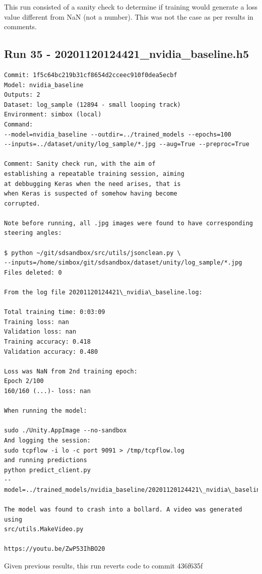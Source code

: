 This run consisted of a sanity check to determine if training would generate a loss value different from NaN (not a number). This was not the case as per results in comments.

\subsection{Run 35 - 20201120124421\_nvidia\_baseline.h5}
\begin{verbatim}
Commit: 1f5c64bc219b31cf8654d2cceec910f0dea5ecbf
Model: nvidia_baseline
Outputs: 2
Dataset: log_sample (12894 - small looping track)
Environment: simbox (local)
Command: 
--model=nvidia_baseline --outdir=../trained_models --epochs=100
--inputs=../dataset/unity/log_sample/*.jpg --aug=True --preproc=True

Comment: Sanity check run, with the aim of
establishing a repeatable training session, aiming
at debbugging Keras when the need arises, that is
when Keras is suspected of somehow having become 
corrupted. 

Note before running, all .jpg images were found to have corresponding 
steering angles:

$ python ~/git/sdsandbox/src/utils/jsonclean.py \
--inputs=/home/simbox/git/sdsandbox/dataset/unity/log_sample/*.jpg
Files deleted: 0

From the log file 20201120124421\_nvidia\_baseline.log:

Total training time: 0:03:09
Training loss: nan
Validation loss: nan
Training accuracy: 0.418
Validation accuracy: 0.480

Loss was NaN from 2nd training epoch:
Epoch 2/100
160/160 (...)- loss: nan

When running the model:

sudo ./Unity.AppImage --no-sandbox
And logging the session:
sudo tcpflow -i lo -c port 9091 > /tmp/tcpflow.log
and running predictions
python predict_client.py
--model=../trained_models/nvidia_baseline/20201120124421\_nvidia\_baseline.h5

The model was found to crash into a bollard. A video was generated using 
src/utils.MakeVideo.py

https://youtu.be/ZwP53IhBO20

\end{verbatim}

Given previous results, this run reverts code to commit 436f635f

